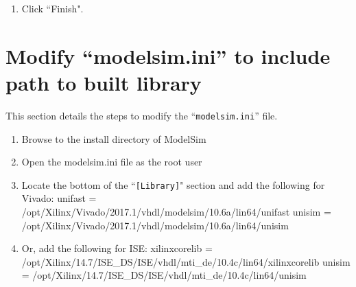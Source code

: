 \begin{flushleft}
\begin{enumerate}
		\item Click ``Finish".
	\end{enumerate}

\newpage

\end{flushleft}

\section{Modify ``modelsim.ini'' to include path to built library}
	This section details the steps to modify the ``\texttt{modelsim.ini}'' file.

	\begin{enumerate}
		\item Browse to the install directory of ModelSim
			\subitem {}
		\item Open the modelsim.ini file as the root user
			\subitem {}
		\item Locate the bottom of the ``\texttt{[Library]}" section and add the following for Vivado:
			\subitem unifast = /opt/Xilinx/Vivado/2017.1/vhdl/modelsim/10.6a/lin64/unifast
			\subitem unisim = /opt/Xilinx/Vivado/2017.1/vhdl/modelsim/10.6a/lin64/unisim
		\item Or, add the following for ISE:
			\subitem xilinxcorelib = /opt/Xilinx/14.7/ISE\_DS/ISE/vhdl/mti\_de/10.4c/lin64/xilinxcorelib
			\subitem unisim = /opt/Xilinx/14.7/ISE\_DS/ISE/vhdl/mti\_de/10.4c/lin64/unisim

	\end{enumerate}

